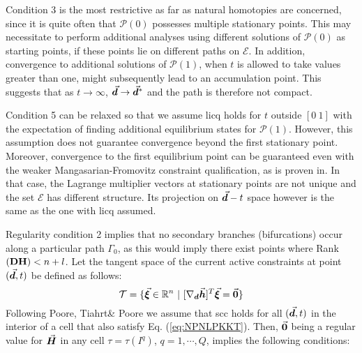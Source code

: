 Condition 3 is the most restrictive as far as natural homotopies are concerned,
since it is quite often that $\bm{\mathcal{P}}(0)$ possesses multiple stationary
points. This may necessitate to perform additional analyses using different
solutions of $\bm{\mathcal{P}}(0)$ as starting points, if these points lie on
different paths on $\mathcal{E}$. In addition, convergence to additional
solutions of $\bm{\mathcal{P}}(1)$, when $t$
is allowed to take values
greater than one, might subsequently lead to an accumulation point. This 
suggests
that as $t\rightarrow \infty$, $\vec{\bm{d}}\rightarrow \vec{\bm{d}}^*$ and the path is
therefore not compact.

Condition 5 can be relaxed so that we assume \acrshort{licq} holds for 
$t$ outside $[0\ 1]$ with the expectation of
finding additional equilibrium states for $\bm{\mathcal{P}}(1)$. However, this
assumption does not guarantee convergence beyond the first stationary point.
Moreover, convergence to the first equilibrium point can be guaranteed even with
the weaker Mangasarian-Fromovitz constraint qualification, as is proven
in\cite{Kojima:1984,Gfrerer:1985}. In that case, the Lagrange multiplier vectors
at stationary points are not unique and the set $\mathcal{E}$ has different 
structure. Its
projection on $\vec{\bm{d}}-t$ space however is the same as the one with 
\acrshort{licq}
assumed.

Regularity condition 2 implies that no
secondary branches (bifurcations) occur along a particular path 
$\mathit{\Gamma_0}$, as this would imply there exist points where 
Rank$(\mathbf{DH})< n+l$. Let the
tangent space of the current active constraints at point $(\vec{\bm{d}},t)$ be 
defined as follows:
\begin{equation}
	\mathcal{T} = \{\vec{\bm{\xi}}\in\mathbb{R}^n\ |\
	[\nabla_{\bm{d}} \vec{\bm{h}}]^T\vec{\bm{\xi}}=\vec{\bm{0}}\}
	\label{eq:TangentSpace}
\end{equation}
Following 
Poore\cite{Poore:1990}, Tiahrt\& Poore\cite{Tiahrt:1989} we assume that 
\acrshort{scc}
holds for all $(\vec{\bm{d}},t)$ in the interior of a cell that also satisfy Eq.
(\ref{eq:NPNLPKKT}). Then, $\vec{\bm{0}}$ being a regular value for
$\vec{\bm{H}}$ in any cell $\tau=\tau(I^q)$, $q=1,\cdots,Q$, implies the
following conditions:

